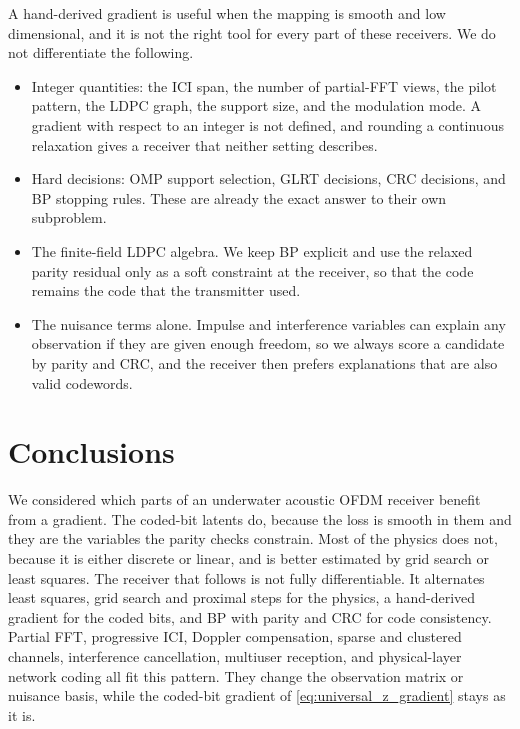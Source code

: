 \documentclass[11pt]{article}
\begin{document}
A hand-derived gradient is useful when the mapping is smooth and
low dimensional, and it is not the right tool for every part of these receivers.
We do not differentiate the following.
\begin{itemize}
  \item Integer quantities: the ICI span, the number of partial-FFT views, the pilot pattern, the
  LDPC graph, the support size, and the modulation mode.  A gradient with
  respect to an integer is not defined, and rounding a continuous relaxation
  gives a receiver that neither setting describes.
  \item Hard decisions: OMP support selection, GLRT decisions, CRC decisions,
  and BP stopping rules.  These are already the exact answer to their own
  subproblem.
  \item The finite-field LDPC algebra.  We keep BP explicit and use the relaxed
  parity residual only as a soft constraint at the receiver, so that the code
  remains the code that the transmitter used.
  \item The nuisance terms alone.  Impulse and interference variables can
  explain any observation if they are given enough freedom, so we always score a
  candidate by parity and CRC, and the receiver then prefers explanations that
  are also valid codewords.
\end{itemize}

\section{Conclusions}

We considered which parts of an underwater acoustic OFDM receiver benefit from a
gradient.  The coded-bit latents do, because the loss is smooth in them and they
are the variables the parity checks constrain.  Most of the physics does not,
because it is either discrete or linear, and is better estimated by grid search
or least squares.  The receiver that follows is not fully differentiable.  It
alternates least squares, grid search and proximal steps for the physics, a
hand-derived gradient for the coded bits, and BP with parity and CRC for code
consistency.  Partial FFT, progressive ICI, Doppler compensation, sparse and
clustered channels, interference cancellation, multiuser reception, and
physical-layer network coding all fit this pattern.  They change the observation
matrix or nuisance basis, while the coded-bit gradient of
\eqref{eq:universal_z_gradient} stays as it is.
\end{document}

